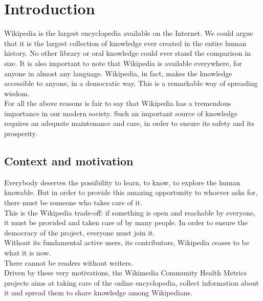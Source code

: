 \chapter{Introduction}
\label{cha:introduction}
Wikipedia is the largest encyclopedia available on the Internet. We could argue that it is the largest collection of knowledge ever created in the entire human history. No other library or oral knowledge could ever stand the comparison in size. It is also important to note that Wikipedia is available everywhere, for anyone in almost any language. Wikipedia, in fact, makes the knowledge accessible to anyone, in a democratic way. This is a remarkable way of spreading wisdom.\\
For all the above reasons is fair to say that Wikipedia has a tremendous importance in our modern society. Such an important source of knowledge requires an adequate maintenance and care, in order to ensure its safety and its prosperity.
\section{Context and motivation}
\label{sec:context}
Everybody deserves the possibility to learn, to know, to explore the human knowable. But in order to provide this amazing opportunity to whoever asks for, there must be someone who takes care of it. \\
This is the Wikipedia trade-off: if something is open and reachable by everyone, it must be provided and taken care of by many people. In order to ensure the democracy of the project, everyone must join it.\\
Without its fundamental active users, its contributors, Wikipedia ceases to be what it is now.\\
There cannot be readers without writers.\\
Driven by these very motivations, the Wikimedia Community Health Metrics projects aims at taking care of the online encyclopedia, collect information about it and spread them to share knowledge among Wikipedians.
